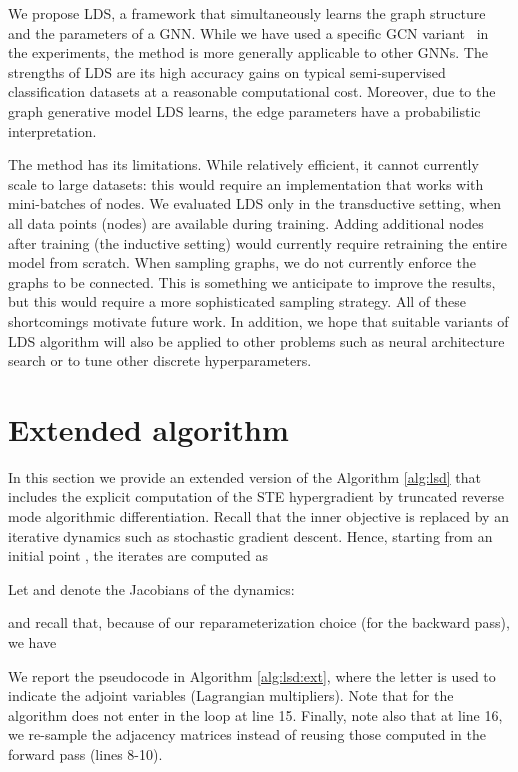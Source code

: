 \documentclass{article}
\newcommand{\lds}{\textsc{LDS}\xspace}
\begin{document}
We propose \lds, a framework that simultaneously learns the graph structure and the parameters of a GNN. While we have used a specific GCN variant~\citep{kipf2016semi} in the experiments, the method is more generally applicable to other GNNs. 
The strengths of \lds are its high accuracy gains on typical semi-supervised classification datasets at a reasonable computational cost. 
Moreover, due to the graph generative model \lds learns, the edge parameters have a probabilistic interpretation. 

The method has its limitations. While relatively efficient, it cannot currently scale to large datasets: this would require an implementation that works with mini-batches of nodes.  We evaluated \lds only in the transductive setting,  when all data points (nodes) are available during training. Adding additional nodes after training (the inductive setting) would currently require retraining the entire model from scratch. When sampling graphs, we do not currently enforce the graphs to be connected. This is something we anticipate to improve the results, but this would require a more sophisticated sampling strategy. All of these shortcomings motivate future work.
In addition, we hope that suitable variants of \lds algorithm will also be applied to other problems such as neural architecture search or to tune other discrete hyperparameters.








\clearpage

\appendix

\section{Extended algorithm}
\label{sec:apx:extalgo}

In this section we provide an extended version of the Algorithm \ref{alg:lsd} that includes the explicit computation of the STE hypergradient by truncated reverse mode algorithmic differentiation. Recall that the inner objective is replaced by an iterative dynamics  such as stochastic gradient descent. Hence, starting from an initial point , the iterates are computed as  

Let  and  denote the Jacobians of the dynamics:

and recall that, because of our reparameterization choice (for the backward pass), we have 

We report the pseudocode in Algorithm \ref{alg:lsd:ext}, where the letter  is used to indicate the adjoint variables (Lagrangian multipliers).
Note that for  the algorithm does not enter in the loop at line 15.
Finally, note also that at line 16, we re-sample the adjacency matrices instead of reusing  those computed in the forward pass (lines 8-10).
\end{document}
